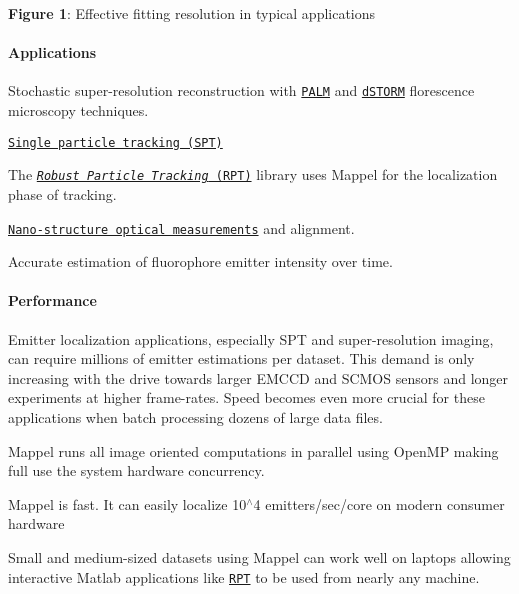 \href{https://raw.githubusercontent.com/markjolah/Mappel/master/doc/images/mappel_fitting_resolution.png}{\tt }

{\bfseries Figure 1}\+: Effective fitting resolution in typical applications 

\paragraph*{Applications}


\begin{DoxyItemize}
\item Stochastic super-\/resolution reconstruction with \href{https://en.wikipedia.org/wiki/Photoactivated_localization_microscopy}{\tt P\+A\+LM} and \href{https://en.wikipedia.org/wiki/Super-resolution_microscopy#Direct_stochastical_optical_reconstruction_microscopy_(dSTORM)}{\tt d\+S\+T\+O\+RM} florescence microscopy techniques.
\item \href{https://en.wikipedia.org/wiki/Single-particle_tracking}{\tt Single particle tracking (S\+PT)}
\begin{DoxyItemize}
\item The \href{https://markjolah.github.io/RPT}{\tt {\itshape Robust Particle Tracking} (R\+PT)} library uses Mappel for the localization phase of tracking.
\end{DoxyItemize}
\item \href{https://iopscience.iop.org/article/10.1088/1367-2630/aa5f74}{\tt Nano-\/structure optical measurements} and alignment.
\item Accurate estimation of fluorophore emitter intensity over time.
\end{DoxyItemize}

\paragraph*{Performance}

Emitter localization applications, especially S\+PT and super-\/resolution imaging, can require millions of emitter estimations per dataset. This demand is only increasing with the drive towards larger E\+M\+C\+CD and S\+C\+M\+OS sensors and longer experiments at higher frame-\/rates. Speed becomes even more crucial for these applications when batch processing dozens of large data files.


\begin{DoxyItemize}
\item Mappel runs all image oriented computations in parallel using Open\+MP making full use the system hardware concurrency.
\item Mappel is fast. It can easily localize 10$^\wedge$4 emitters/sec/core on modern consumer hardware
\item Small and medium-\/sized datasets using Mappel can work well on laptops allowing interactive Matlab applications like \href{https://markjolah.github.io/RPT}{\tt R\+PT} to be used from nearly any machine.
\end{DoxyItemize}

